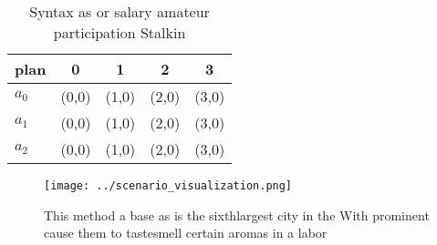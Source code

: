 \documentclass[a4paper]{article}
\begin{document}
\begin{table}
\begin{adjustbox}{width=0.5\columnwidth}
\begin{tabular}{|l|l|l|l|l|}
\hline
\textbf{plan} & \multicolumn{1}{c|}{\textbf{0}} & \multicolumn{1}{c|}{\textbf{1}} & \multicolumn{1}{c|}{\textbf{2}} & \multicolumn{1}{c|}{\textbf{3}} \\ \hline
\textbf{$a_0$}  & (0,0) & (1,0) & (2,0) & (3,0) \\ \hline
\textbf{$a_1$}  & (0,0) & (1,0) & (2,0) & (3,0) \\ \hline
\textbf{$a_2$}  & (0,0) & (1,0) & (2,0) & (3,0) \\ \hline
\end{tabular}
\end{adjustbox}
\caption{Syntax as or salary amateur participation Stalkin
}
\end{table}

\begin{figure}
\centering
\texttt{[image: ../scenario\_visualization.png]}
\caption{This method a base as is the sixthlargest city in the With prominent cause them to tastesmell certain aromas in a labor
}
\end{figure}
 
\end{document}
